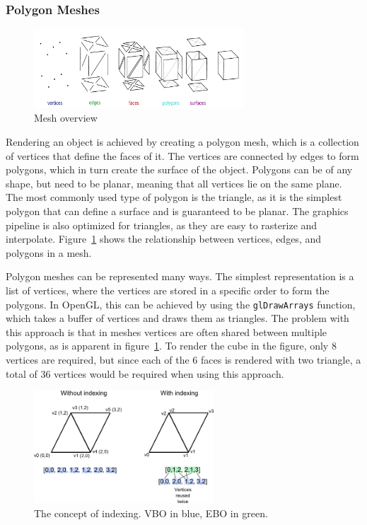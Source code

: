 \subsubsection{Polygon Meshes}

\begin{figure}[h]
    \centering
    \includegraphics[width=0.70\textwidth]{images/Mesh_overview}
    \caption{Mesh overview}
    \label{fig:mesh-overview}
\end{figure}

Rendering an object is achieved by creating a polygon mesh, which is a collection of vertices that define the faces of it.
The vertices are connected by edges to form polygons, which in turn create the surface of the object.
Polygons can be of any shape, but need to be planar, meaning that all vertices lie on the same plane.
The most commonly used type of polygon is the triangle, as it is the simplest polygon that can define a surface and is guaranteed to be planar.
The graphics pipeline is also optimized for triangles, as they are easy to rasterize and interpolate.
Figure~\ref{fig:mesh-overview} shows the relationship between vertices, edges, and polygons in a mesh. \cite{dorner_virtual_2019}

Polygon meshes can be represented many ways.
The simplest representation is a list of vertices, where the vertices are stored in a specific order to form the polygons.
In OpenGL, this can be achieved by using the \texttt{glDrawArrays} function,
which takes a buffer of vertices and draws them as triangles.
The problem with this approach is that in meshes vertices are often shared between multiple polygons,
as is apparent in figure~\ref{fig:mesh-overview}.
To render the cube in the figure, only 8 vertices are required,
but since each of the 6 faces is rendered with two triangle,
a total of 36 vertices would be required when using this approach.~\cite{dorner_virtual_2019, de_vries_learn_2020}


\begin{figure}[h]
    \centering
    \includegraphics[width=0.60\textwidth]{images/index_buffer}
    \caption{The concept of indexing. VBO in blue, EBO in green.}
    \label{fig:index-buffer}
\end{figure}

